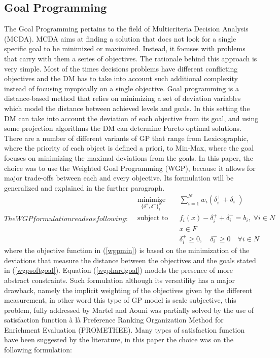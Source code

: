 \documentclass[conference,final,]{IEEEtran}
\begin{document}
\hypertarget{goal-programming}{%
\subsection{Goal Programming}\label{goal-programming}}
The Goal Programming \cite{charnes55} pertains to the field of Multicriteria Decision Analysis (MCDA). MCDA aims at finding a solution that does not look for a single specific goal to be minimized or maximized. Instead, it focuses with problems that carry with them a series of objectives. The rationale behind this approach is very simple. Most of the times decisions problems have different conflicting objectives and the DM has to take into account such additional complexity instead of focusing myopically on a single objective. Goal programming is a distance-based method that relies on minimizing a set of deviation variables which model the distance between achieved levels and goals. In this setting the DM can take into account the deviation of each objective from its goal, and using some projection algorithms the DM can determine Pareto optimal solutions. There are a number of different variants of GP that range from Lexicographic, where the priority of each object is defined a priori, to Min-Max, where the goal focuses on minimizing the maximal deviations from the goals. In this paper, the choice was to use the Weighted Goal Programming (WGP), because it allows for major trade-offs between each and every objective. Its formulation will be generalized and explained in the further paragraph.
\begin{subequations}
The WGP formulation reads as following:
\begin{align}
    & \underset{\{\delta^+,\delta^-\}^N_1}{\text{minimize}} & & \sum^N_{i=1}w_i (\delta^+_i + \delta^-_i) \label{wgpmin} \\
    & \text{subject to} & & f_i(x) - \delta^+_i + \delta^-_i=b_i, \; \forall i \in N \label{wgpsoftgoal} \\
    & & & x\in F \label{wgphardgoal}\\
    & & & \delta^+_i\geq 0, \quad \delta^-_i\geq 0 \quad \forall i \in N \label{wgppositivity}
\end{align}
\end{subequations}
where the objective function in (\ref{wgpmin}) is based on the minimization of the deviations that measure the distance between the objectives and the goals stated in (\ref{wgpsoftgoal}). Equation (\ref{wgphardgoal}) models the presence of more abstract constraints. Such formulation although its versatility has a major drawback, namely the implicit weighting of the objectives given by the different measurement, in other word this type of GP model is scale subjective, this problem, fully addressed by Martel and Aouni \cite{martel96} was partially solved by the use of satisfaction function à là Preference Ranking Organization Method for Enrichment Evaluation (PROMETHEE). Many types of satisfaction function have been suggested by the literature, in this paper the choice was on the following formulation:
\end{document}
